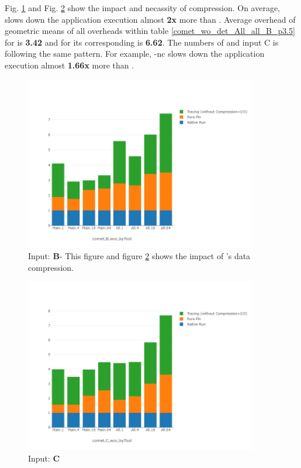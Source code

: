 Fig. \ref{comet_chartDet_B_woc_byTool_p3_5} and Fig. \ref{comet_chartDet_C_woc_byTool_p3_5} show the impact and necassity of compression. On average, \parlotnc slows down the application execution almost \textbf{2x} more than \parlota. Average overhead of geometric means of all overheads within table \ref{comet_wo_det_All_all_B_p3.5} for \parlota is \textbf{3.42} and for its corresponding \parlotnc is \textbf{6.62}. The numbers of \parlotm and input C is following the same pattern. For example, \parlot-nc slows down the application execution almost \textbf{1.66x} more than \parlotm.


\begin{figure}[!t]
\centering
\includegraphics[width=4in]{figs.comet.newMed/comet_chartDet_B_woc_byTool_p3_5.png}
\caption{ Input: \textbf{B}- This figure and figure \ref{comet_chartDet_C_woc_byTool_p3_5} shows the impact of \parlot 's data compression.
}
\label{comet_chartDet_B_woc_byTool_p3_5}
\end{figure}

\begin{figure}[!t]
\centering
\includegraphics[width=4in]{figs.comet.newMed/comet_chartDet_C_woc_byTool_p3_5.png}
\caption{ Input: \textbf{C}
}
\label{comet_chartDet_C_woc_byTool_p3_5}
\end{figure}




